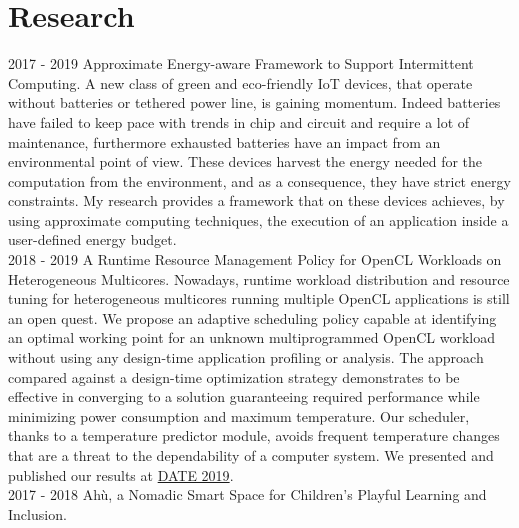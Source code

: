 \documentclass[letterpaper]{twentysecondcv} %
\begin{document}
\section{Research}
\begin{twenty}
	\twentyitem
	{2017 - 2019}
	{}
	{Approximate Energy-aware Framework to Support Intermittent Computing.}
	{}
	{
		A new class of green and eco-friendly IoT devices, that operate without batteries or tethered power line, is gaining momentum. Indeed batteries have failed to keep pace with trends in chip and circuit and require a lot of maintenance, furthermore exhausted batteries have an impact from an environmental point of view. These devices harvest the energy needed for the computation from the environment, and as a consequence, they have strict energy constraints. My research provides a framework that on these devices achieves, by using approximate computing techniques, the execution of an application inside a user-defined energy budget.
			{
			}
	}
	{\footnotesize{}}
	\\
	\twentyitem
	{2018 - 2019}
	{}
	{A Runtime Resource Management Policy for OpenCL Workloads on Heterogeneous Multicores.}
	{}
	{
	Nowadays, runtime workload distribution and resource tuning for heterogeneous multicores running multiple OpenCL applications is still an open quest. We propose an adaptive scheduling policy capable at identifying an optimal working point for an unknown multiprogrammed OpenCL workload without using any design-time application profiling or analysis. The approach compared against a design-time optimization strategy demonstrates to be effective in converging to a solution guaranteeing required performance while minimizing power consumption and maximum temperature. Our scheduler, thanks to a temperature predictor module, avoids frequent temperature changes that are a threat to the dependability of a computer system. We presented and published our results at \href{https://past.date-conference.com}{DATE 2019}.
	{
	}
	}
	{\footnotesize{}}
	\\
	\twentyitem
	{2017 - 2018}
	{}
	{Ahù, a Nomadic Smart Space for Children’s Playful Learning and Inclusion.}

\end{twenty}
\end{document}
